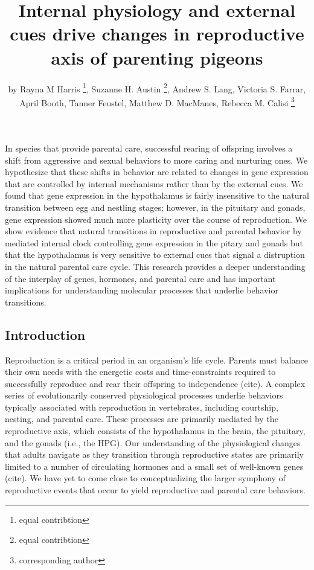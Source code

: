 \title{Internal physiology and external cues drive changes in reproductive axis
of parenting pigeons}
\author{by Rayna M Harris \footnote{equal contribtion}, Suzanne H. Austin \footnote{equal contribtion}, Andrew S. Lang, Victoria S. Farrar, April Booth, Tanner Feustel, Matthew D. MacManes, Rebecca M. Calisi \footnote{corresponding author}}

\maketitle



In species that provide parental care, successful rearing of offspring involves a shift from aggressive and sexual behaviors to more caring and nurturing ones.  We hypothesize that these shifts in behavior are related to changes in gene expression that are controlled by internal mechanisms rather than by the external cues.  We found that gene expression in the hypothalamus is fairly insensitive to the natural transition between egg and nestling stages; however, in the pituitary and gonads, gene expression showed much more plasticity over the course of reproduction. We show evidence that natural transitions in reproductive and parental behavior by mediated internal clock controlling gene expression in the pitary and gonads but that the hypothalamus is very sensitive to external cues that signal a distruption in the natural parental care cycle. This research provides a deeper understanding of the interplay of genes, hormones, and parental care and has important implications for understanding molecular processes that underlie behavior transitions.

\hypertarget{introduction}{%
\subsection{Introduction}\label{introduction}}

Reproduction is a critical period in an organism's life cycle. Parents
must balance their own needs with the energetic costs and
time-constraints required to successfully reproduce and rear their
offspring to independence (cite). A complex series of evolutionarily
conserved physiological processes underlie behaviors typically
associated with reproduction in vertebrates, including courtship,
nesting, and parental care. These processes are primarily mediated by
the reproductive axis, which consists of the hypothalamus in the brain,
the pituitary, and the gonads (i.e., the HPG). Our understanding of the
physiological changes that adults navigate as they transition through
reproductive states are primarily limited to a number of circulating
hormones and a small set of well-known genes (cite). We have yet to come
close to conceptualizing the larger symphony of reproductive events that
occur to yield reproductive and parental care behaviors.

